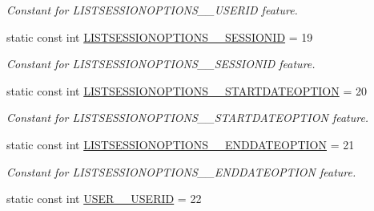 \begin{DoxyCompactItemize}
\begin{DoxyCompactList}\small\item\em Constant for LISTSESSIONOPTIONS\_\-\_\-USERID feature. \item\end{DoxyCompactList}\item 
\hypertarget{classUMS__Data_1_1UMS__DataPackage_adde877aa4faecae3e2318359af6a8f2b}{
static const int \hyperlink{classUMS__Data_1_1UMS__DataPackage_adde877aa4faecae3e2318359af6a8f2b}{LISTSESSIONOPTIONS\_\-\_\-SESSIONID} = 19}
\label{classUMS__Data_1_1UMS__DataPackage_adde877aa4faecae3e2318359af6a8f2b}

\begin{DoxyCompactList}\small\item\em Constant for LISTSESSIONOPTIONS\_\-\_\-SESSIONID feature. \item\end{DoxyCompactList}\item 
\hypertarget{classUMS__Data_1_1UMS__DataPackage_a9cb897d6255f0eae3ac3025d6f0b3db3}{
static const int \hyperlink{classUMS__Data_1_1UMS__DataPackage_a9cb897d6255f0eae3ac3025d6f0b3db3}{LISTSESSIONOPTIONS\_\-\_\-STARTDATEOPTION} = 20}
\label{classUMS__Data_1_1UMS__DataPackage_a9cb897d6255f0eae3ac3025d6f0b3db3}

\begin{DoxyCompactList}\small\item\em Constant for LISTSESSIONOPTIONS\_\-\_\-STARTDATEOPTION feature. \item\end{DoxyCompactList}\item 
\hypertarget{classUMS__Data_1_1UMS__DataPackage_ac4ae1bca502b520be1c21d53d956560f}{
static const int \hyperlink{classUMS__Data_1_1UMS__DataPackage_ac4ae1bca502b520be1c21d53d956560f}{LISTSESSIONOPTIONS\_\-\_\-ENDDATEOPTION} = 21}
\label{classUMS__Data_1_1UMS__DataPackage_ac4ae1bca502b520be1c21d53d956560f}

\begin{DoxyCompactList}\small\item\em Constant for LISTSESSIONOPTIONS\_\-\_\-ENDDATEOPTION feature. \item\end{DoxyCompactList}\item 
\hypertarget{classUMS__Data_1_1UMS__DataPackage_a29433fbaf7f0cc57b9e7eefb9de35121}{
static const int \hyperlink{classUMS__Data_1_1UMS__DataPackage_a29433fbaf7f0cc57b9e7eefb9de35121}{USER\_\-\_\-USERID} = 22}
\label{classUMS__Data_1_1UMS__DataPackage_a29433fbaf7f0cc57b9e7eefb9de35121}


\end{DoxyCompactItemize}
